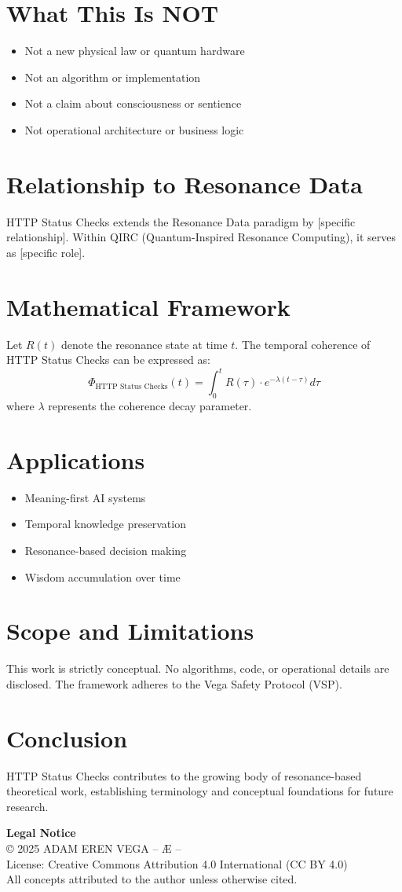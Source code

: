 \documentclass[12pt,a4paper]{article}
\begin{document}
\section{What This Is NOT}
\begin{itemize}
\item Not a new physical law or quantum hardware
\item Not an algorithm or implementation
\item Not a claim about consciousness or sentience
\item Not operational architecture or business logic
\end{itemize}

\section{Relationship to Resonance Data}
HTTP Status Checks extends the Resonance Data paradigm by [specific relationship].
Within QIRC (Quantum-Inspired Resonance Computing), it serves as [specific role].

\section{Mathematical Framework}
Let $R(t)$ denote the resonance state at time $t$. The temporal coherence of HTTP Status Checks 
can be expressed as:
\[
\Phi_{\text{HTTP Status Checks}}(t) = \int_0^t R(\tau) \cdot e^{-\lambda(t-\tau)} d\tau
\]
where $\lambda$ represents the coherence decay parameter.

\section{Applications}
\begin{itemize}
\item Meaning-first AI systems
\item Temporal knowledge preservation
\item Resonance-based decision making
\item Wisdom accumulation over time
\end{itemize}

\section{Scope and Limitations}
This work is strictly conceptual. No algorithms, code, or operational details are disclosed.
The framework adheres to the Vega Safety Protocol (VSP).

\section{Conclusion}
HTTP Status Checks contributes to the growing body of resonance-based theoretical work, 
establishing terminology and conceptual foundations for future research.

\vspace{1cm}
\noindent\textbf{Legal Notice}\\
© 2025 ADAM EREN VEGA – Æ –\\
License: Creative Commons Attribution 4.0 International (CC BY 4.0)\\
All concepts attributed to the author unless otherwise cited.
\end{document}
